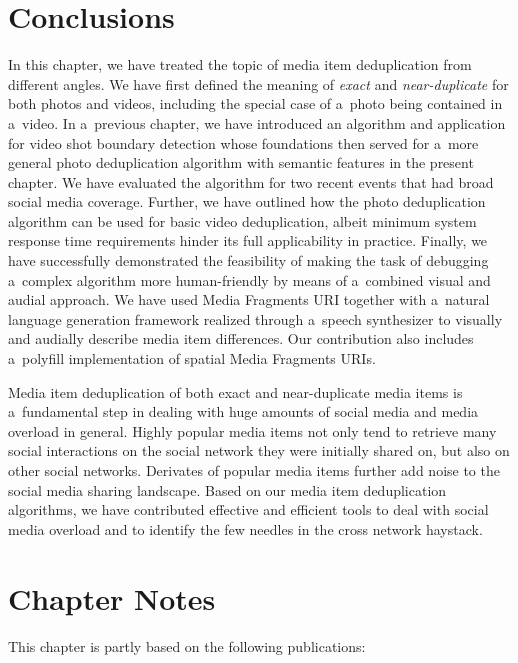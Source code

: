 \section{Conclusions}

In this chapter, we have treated the topic of media item deduplication
from different angles.
We have first defined the meaning of \emph{exact} and \emph{near-duplicate} 
for both photos and videos,
including the special case of a~photo being contained in a~video.
In a~previous chapter,
we have introduced an algorithm and application
for video shot boundary detection
whose foundations then served for a~more general
photo deduplication algorithm with semantic features
in the present chapter.
We have evaluated the algorithm for two recent events
that had broad social media coverage.
Further, we have outlined how the photo deduplication algorithm
can be used for basic video deduplication,
albeit minimum system response time requirements
hinder its full applicability in practice.
Finally, we have successfully demonstrated the feasibility
of making the task of debugging a~complex algorithm
more human-friendly by means of a~combined visual and audial approach.
We have used Media Fragments URI
together with a~natural language generation framework
realized through a~speech synthesizer to visually and audially
describe media item differences.
Our contribution also includes a~polyfill implementation
of spatial Media Fragments URIs.

Media item deduplication of both exact and near-duplicate media items
is a~fundamental step in dealing with huge amounts of social media
and media overload in general.
Highly popular media items not only tend
to retrieve many social interactions on the social network
they were initially shared on, but also on other social networks.
Derivates of popular media items further add noise
to the social media sharing landscape.
Based on our media item deduplication algorithms, 
we have contributed effective and efficient tools
to deal with social media overload
and to identify the few needles in the cross network haystack. 

\section*{Chapter Notes}
This chapter is partly based on the following publications:



